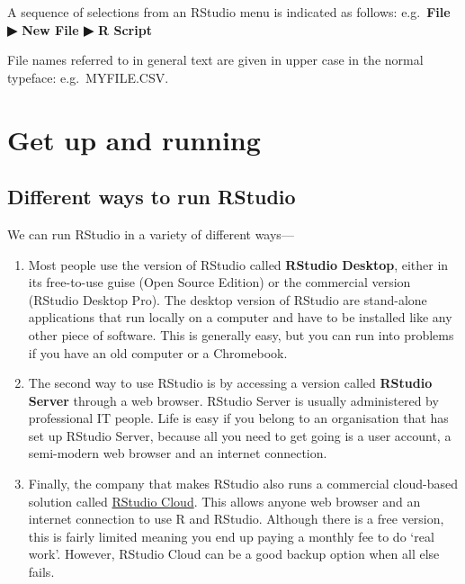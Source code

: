 \documentclass[
]{book}
\providecommand{\tightlist}{%
  \setlength{\itemsep}{0pt}\setlength{\parskip}{0pt}}
\begin{document}
A sequence of selections from an RStudio menu is indicated as follows: e.g.~\textbf{File ▶ New File ▶ R Script}

File names referred to in general text are given in upper case in the normal typeface: e.g.~MYFILE.CSV.

\hypertarget{get-up-and-running}{%
\chapter*{Get up and running}\label{get-up-and-running}}

\hypertarget{different-ways-to-run-rstudio}{%
\section*{Different ways to run RStudio}\label{different-ways-to-run-rstudio}}

We can run RStudio in a variety of different ways---

\begin{enumerate}
\def\labelenumi{\arabic{enumi}.}
\tightlist
\item
  Most people use the version of RStudio called \textbf{RStudio Desktop}, either in its free-to-use guise (Open Source Edition) or the commercial version (RStudio Desktop Pro). The desktop version of RStudio are stand-alone applications that run locally on a computer and have to be installed like any other piece of software. This is generally easy, but you can run into problems if you have an old computer or a Chromebook.
\item
  The second way to use RStudio is by accessing a version called \textbf{RStudio Server} through a web browser. RStudio Server is usually administered by professional IT people. Life is easy if you belong to an organisation that has set up RStudio Server, because all you need to get going is a user account, a semi-modern web browser and an internet connection.
\item
  Finally, the company that makes RStudio also runs a commercial cloud-based solution called \href{https://rstudio.com/products/cloud/}{RStudio Cloud}. This allows anyone web browser and an internet connection to use R and RStudio. Although there is a free version, this is fairly limited meaning you end up paying a monthly fee to do `real work'. However, RStudio Cloud can be a good backup option when all else fails.
\end{enumerate}
\end{document}
